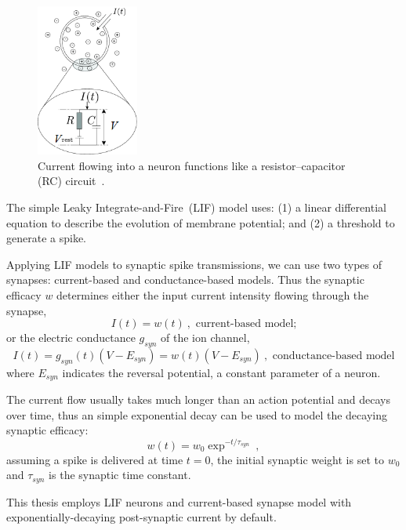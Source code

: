 \begin{figure}[tb!]
	\centering
	\includegraphics[width=0.3\textwidth]{pics_snn/RC.png}
	\caption{Current flowing into a neuron functions like a resistor–capacitor (RC) circuit~\cite{gerstner2014neuronal}.}
	\label{Fig:rc}
\end{figure}

The simple Leaky Integrate-and-Fire~(LIF) model uses: (1) a linear differential equation to describe the evolution of membrane potential;
and (2) a threshold to generate a spike.

Applying LIF models to synaptic spike transmissions, we can use two types of synapses: current-based and conductance-based models.
Thus the synaptic efficacy $w$ determines either the input current intensity flowing through the synapse,
\begin{equation}
I(t) = w(t)~, \textrm{~current-based model;}
\end{equation}
or the electric conductance $g_{syn}$ of the ion channel,
\begin{equation}
	I(t) = g_{syn}(t) (V-E_{syn}) = w(t) (V-E_{syn})~, \textrm{~conductance-based model}
\end{equation}
where $E_{syn}$ indicates the reversal potential, a constant parameter of a neuron.

The current flow usually takes much longer than an action potential and decays over time, thus an simple exponential decay can be used to model the decaying synaptic efficacy:
\begin{equation}
w(t) = w_0 \exp^{-t/\tau_{syn}}~,
\end{equation}
assuming a spike is delivered at time $t=0$, the initial synaptic weight is set to $w_0$ and $\tau_{syn}$ is the synaptic time constant.

This thesis employs LIF neurons and current-based synapse model with exponentially-decaying post-synaptic current by default.

